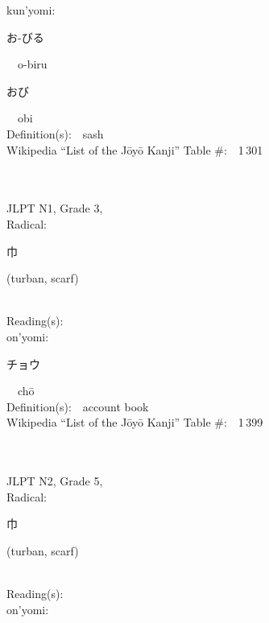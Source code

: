 \begin{multicols}{2}
{\hspace*{1em}}kun'yomi:\ \ \\
{\hspace*{2em}}{\begin{CJK}{UTF8}{min} お-びる \end{CJK}}\ \ o-biru\ \ \\
{\hspace*{2em}}{\begin{CJK}{UTF8}{min} おび \end{CJK}}\ \ obi\ \ \\
Definition(s):\ \ sash \\
Wikipedia ``List of the J\=oy\=o Kanji'' Table \#:\ \ 1\,301 \\
\ \ \\
{\fontsize{34pt}{40pt}  }\ \ \\  %
{JLPT N1, Grade 3, \\Radical:\ \ {\begin{CJK}{UTF8}{min} 巾 \end{CJK}} (turban, scarf) } \\
Reading(s):\ \ \\
{\hspace*{1em}}on'yomi:\ \ \\
{\hspace*{2em}}{\begin{CJK}{UTF8}{min} チョウ \end{CJK}}\ \ ch\=o\ \ \\
Definition(s):\ \ account book \\
Wikipedia ``List of the J\=oy\=o Kanji'' Table \#:\ \ 1\,399 \\
\ \ \\
{\fontsize{34pt}{40pt}  }\ \ \\  %
{JLPT N2, Grade 5, \\Radical:\ \ {\begin{CJK}{UTF8}{min} 巾 \end{CJK}} (turban, scarf) } \\
Reading(s):\ \ \\
{\hspace*{1em}}on'yomi:\ \ \\

\end{multicols}
